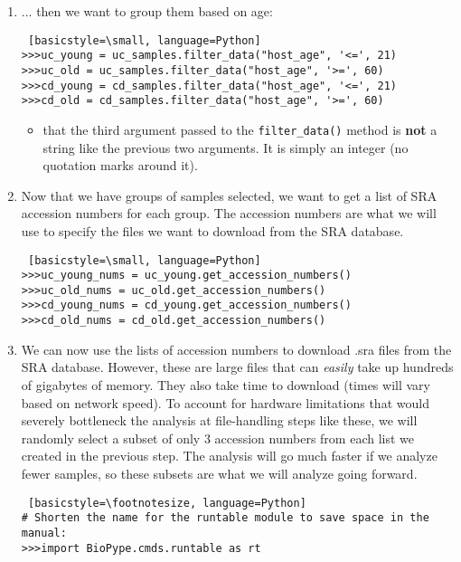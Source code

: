 \begin{enumerate}
                
            \item ... then we want to group them based on age:
            \begin{lstlisting} [basicstyle=\small, language=Python]
>>>uc_young = uc_samples.filter_data("host_age", '<=', 21)
>>>uc_old = uc_samples.filter_data("host_age", '>=', 60)
>>>cd_young = cd_samples.filter_data("host_age", '<=', 21)
>>>cd_old = cd_samples.filter_data("host_age", '>=', 60)
            \end{lstlisting}
                \begin{itemize}
                \item {} that the third argument passed to the \verb|filter_data()| method is \textbf{not} a string like the previous two arguments. It is simply an integer (no quotation marks around it).
                \end{itemize}
                
                
            \item Now that we have groups of samples selected, we want to get a list of SRA accession numbers for each group. The accession numbers are what we will use to specify the files we want to download from the SRA database. 
            \begin{lstlisting} [basicstyle=\small, language=Python]
>>>uc_young_nums = uc_young.get_accession_numbers()
>>>uc_old_nums = uc_old.get_accession_numbers()
>>>cd_young_nums = cd_young.get_accession_numbers()
>>>cd_old_nums = cd_old.get_accession_numbers()
            \end{lstlisting}
            
            
            \item {}
            We can now use the lists of accession numbers to download .sra files from the SRA database. However, these are large files that can \textit{easily} take up hundreds of gigabytes of memory. They also take time to download (times will vary based on network speed). To account for hardware limitations that would severely bottleneck the analysis at file-handling steps like these, we will randomly select a subset of only 3 accession numbers from each list we created in the previous step. The analysis will go much faster if we analyze fewer samples, so these subsets are what we will analyze going forward.
            \begin{lstlisting} [basicstyle=\footnotesize, language=Python]
# Shorten the name for the runtable module to save space in the manual:
>>>import BioPype.cmds.runtable as rt


\end{lstlisting}
\end{enumerate}
